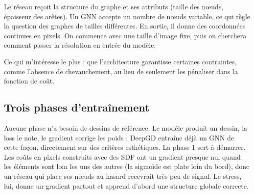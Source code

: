 \documentclass[11pt,a4paper]{article}
\begin{document}
Le réseau reçoit la structure du graphe et ses attributs (taille des nœuds, épaisseur des arêtes). Un GNN accepte un nombre de nœuds variable, ce qui règle la question des graphes de tailles différentes. En sortie, il donne des coordonnées continues en pixels. On commence avec une taille d'image fixe, puis on cherchera comment passer la résolution en entrée du modèle.

Ce qui m'intéresse le plus : que l'architecture garantisse certaines contraintes, comme l'absence de chevauchement, au lieu de seulement les pénaliser dans la fonction de coût.

\subsection{Trois phases d'entraînement}

\begin{center}
\end{center}

Aucune phase n'a besoin de dessins de référence. Le modèle produit un dessin, la loss le note, le gradient corrige les poids : DeepGD entraîne déjà un GNN de cette façon, directement sur des critères esthétiques. La phase 1 sert à démarrer. Les coûts en pixels construits avec des SDF ont un gradient presque nul quand les éléments sont loin les uns des autres (la sigmoïde est plate loin du bord), donc un réseau qui place ses nœuds au hasard recevrait très peu de signal. Le stress, lui, donne un gradient partout et apprend d'abord une structure globale correcte.
\end{document}
